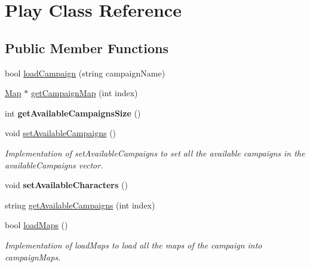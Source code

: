 \hypertarget{class_play}{}\section{Play Class Reference}
\label{class_play}
\subsection*{Public Member Functions}
\begin{DoxyCompactItemize}
\item 
bool \hyperlink{class_play_afcc4c4ace55020c22c5a1568bd8de2fe}{load\+Campaign} (string campaign\+Name)
\item 
\hyperlink{class_map}{Map} $\ast$ \hyperlink{class_play_ac80f55229f24dce5473a3eef9ba35cb0}{get\+Campaign\+Map} (int index)
\item 
\hypertarget{class_play_ae4affe2e28c2377ee56406d297d2e113}{}\label{class_play_ae4affe2e28c2377ee56406d297d2e113} 
int {\bfseries get\+Available\+Campaigns\+Size} ()
\item 
\hypertarget{class_play_adfb9e21780d5bbd912d21cdcb50c158b}{}\label{class_play_adfb9e21780d5bbd912d21cdcb50c158b} 
void \hyperlink{class_play_adfb9e21780d5bbd912d21cdcb50c158b}{set\+Available\+Campaigns} ()
\begin{DoxyCompactList}\small\item\em Implementation of set\+Available\+Campaigns to set all the available campaigns in the available\+Campaigns vector. \end{DoxyCompactList}\item 
\hypertarget{class_play_a933fe6feb1eea405dd281fb0016c8d05}{}\label{class_play_a933fe6feb1eea405dd281fb0016c8d05} 
void {\bfseries set\+Available\+Characters} ()
\item 
string \hyperlink{class_play_a6b634b628eae6bf5af028b5e3c3f7c8b}{get\+Available\+Campaigns} (int index)
\item 
\hypertarget{class_play_a7d1891dd5a4f8754dbdc43cc1b8c3e0d}{}\label{class_play_a7d1891dd5a4f8754dbdc43cc1b8c3e0d} 
bool \hyperlink{class_play_a7d1891dd5a4f8754dbdc43cc1b8c3e0d}{load\+Maps} ()
\begin{DoxyCompactList}\small\item\em Implementation of load\+Maps to load all the maps of the campaign into campaign\+Maps. \end{DoxyCompactList}\item 
\hypertarget{class_play_a4f870d9bd33ec050c8695ef81466eb22}{}\label{class_play_a4f870d9bd33ec050c8695ef81466eb22} 

\end{DoxyCompactItemize}
